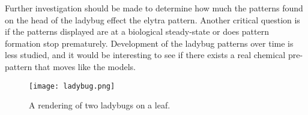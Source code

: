 Further investigation should be made to determine how much the patterns found on the head of the ladybug effect the elytra pattern. Another critical question is if the patterns displayed are at a biological steady-state or does pattern formation stop prematurely. Development of the ladybug patterns over time is less studied, and it would be interesting to see if there exists a real chemical pre-pattern that moves like the models.


\begin{figure}[p]
	\centering
	\texttt{[image: ladybug.png]}
	\caption[A rendering of two ladybugs on a leaf]{A rendering of two ladybugs on a leaf.}
	\label{fig:ladybugRender}
\end{figure}